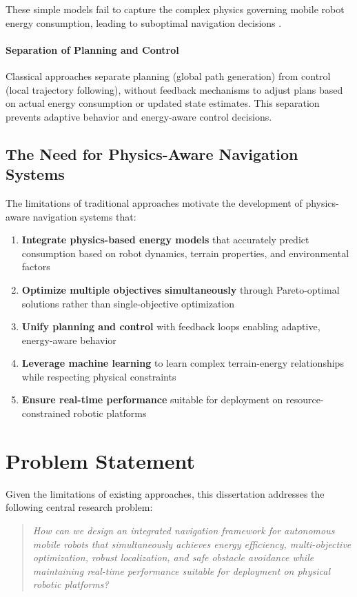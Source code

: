 These simple models fail to capture the complex physics governing mobile robot energy consumption, leading to suboptimal navigation decisions \cite{Sun2015}.

\paragraph{Separation of Planning and Control}
Classical approaches separate planning (global path generation) from control (local trajectory following), without feedback mechanisms to adjust plans based on actual energy consumption or updated state estimates. This separation prevents adaptive behavior and energy-aware control decisions.

\subsection{The Need for Physics-Aware Navigation Systems}

The limitations of traditional approaches motivate the development of physics-aware navigation systems that:

\begin{enumerate}
    \item \textbf{Integrate physics-based energy models} that accurately predict consumption based on robot dynamics, terrain properties, and environmental factors
    \item \textbf{Optimize multiple objectives simultaneously} through Pareto-optimal solutions rather than single-objective optimization
    \item \textbf{Unify planning and control} with feedback loops enabling adaptive, energy-aware behavior
    \item \textbf{Leverage machine learning} to learn complex terrain-energy relationships while respecting physical constraints
    \item \textbf{Ensure real-time performance} suitable for deployment on resource-constrained robotic platforms
\end{enumerate}

\section{Problem Statement}
\label{sec:problem_statement}

Given the limitations of existing approaches, this dissertation addresses the following central research problem:

\begin{quote}
\textit{How can we design an integrated navigation framework for autonomous mobile robots that simultaneously achieves energy efficiency, multi-objective optimization, robust localization, and safe obstacle avoidance while maintaining real-time performance suitable for deployment on physical robotic platforms?}
\end{quote}

